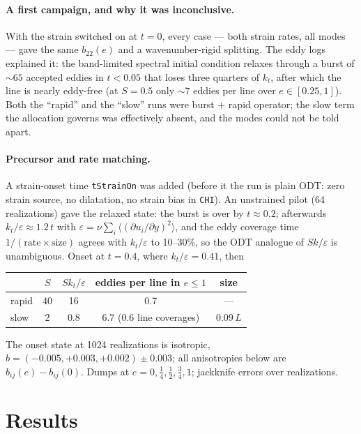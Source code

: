 \documentclass[11pt,a4paper]{article}
\newcommand{\kt}{k_t}
\begin{document}
\paragraph{A first campaign, and why it was inconclusive.} With the strain
switched on at $t=0$, every case --- both strain rates, all modes --- gave
the same $b_{22}(e)$ and a wavenumber-rigid splitting. The eddy logs
explained it: the band-limited spectral initial condition relaxes through a
burst of $\sim65$ accepted eddies in $t<0.05$ that loses three quarters of
$\kt$, after which the line is nearly eddy-free (at $S=0.5$ only $\sim7$
eddies per line over $e\in[0.25,1]$). Both the ``rapid'' and the ``slow''
runs were burst $+$ rapid operator; the slow term the allocation governs
was effectively absent, and the modes could not be told apart.

\paragraph{Precursor and rate matching.} A strain-onset time
\texttt{tStrainOn} was added (before it the run is plain ODT: zero strain
source, no dilatation, no strain bias in \texttt{CHI}). An unstrained
pilot (64 realizations) gave the relaxed state: the burst is over by
$t\approx0.2$; afterwards $\kt/\varepsilon\approx1.2\,t$ with
$\varepsilon=\nu\sum_i\langle(\partial u_i/\partial y)^2\rangle$, and the
eddy coverage time $1/(\text{rate}\times\text{size})$ agrees with
$\kt/\varepsilon$ to 10--30\%, so the ODT analogue of $Sk/\varepsilon$ is
unambiguous. Onset at $t=0.4$, where $\kt/\varepsilon=0.41$, then
\begin{center}
\begin{tabular}{lcccc}
\toprule
 & $S$ & $S\kt/\varepsilon$ & eddies per line in $e\le1$ & size \\
\midrule
rapid & 40 & 16  & 0.7 & --- \\
slow  & 2  & 0.8 & 6.7 (0.6 line coverages) & $0.09\,L$ \\
\bottomrule
\end{tabular}
\end{center}
The onset state at 1024 realizations is isotropic,
$b=(-0.005,+0.003,+0.002)\pm0.003$; all anisotropies below are
$b_{ij}(e)-b_{ij}(0)$. Dumps at $e=0,\tfrac14,\tfrac12,\tfrac34,1$;
jackknife errors over realizations.

\section{Results}
\end{document}
